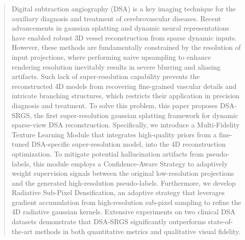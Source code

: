 \documentclass[runningheads]{llncs}
\begin{document}
  
\maketitle              %
\renewcommand{\thefootnote}{\fnsymbol{footnote}}
%
\begin{abstract}
Digital subtraction angiography (DSA) is a key imaging technique for the auxiliary diagnosis and treatment of cerebrovascular diseases. 
Recent advancements in gaussian splatting and dynamic neural representations have enabled robust 3D vessel reconstruction from sparse dynamic inputs.
However, these methods are fundamentally constrained by the resolution of input projections, where performing naive upsampling to enhance rendering resolution inevitably results in severe blurring and aliasing artifacts.
Such lack of super-resolution capability prevents the reconstructed 4D models from recovering fine-grained vascular details and intricate branching structures, which restricts their application in precision diagnosis and treatment. 
To solve this problem, this paper proposes DSA-SRGS, the first super-resolution gaussian splatting framework for dynamic sparse-view DSA reconstruction.
Specifically, we introduce a Multi-Fidelity Texture Learning Module that integrates high-quality priors from a fine-tuned DSA-specific super-resolution model, into the 4D reconstruction optimization.
To mitigate potential hallucination artifacts from pseudo-labels, this module employs a Confidence-Aware Strategy to adaptively weight supervision signals between the original low-resolution projections and the generated high-resolution pseudo-labels.
Furthermore, we develop Radiative Sub-Pixel Densification, an adaptive strategy that leverages gradient accumulation from high-resolution sub-pixel sampling to refine the 4D radiative gaussian kernels.
Extensive experiments on two clinical DSA datasets demonstrate that DSA-SRGS significantly outperforms state-of-the-art methods in both quantitative metrics and qualitative visual fidelity.


\end{abstract}
%
%
%
\end{document}
